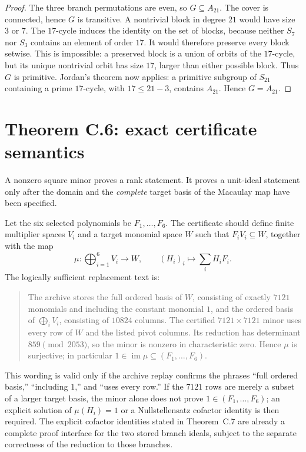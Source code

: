 \documentclass[11pt]{article}
\begin{document}
\begin{proof}
The three branch permutations are even, so $G\subseteq A_{21}$.  The cover
is connected, hence $G$ is transitive.  A nontrivial block in degree $21$
would have size $3$ or $7$.  The $17$-cycle induces the identity on the set
of blocks, because neither $S_7$ nor $S_3$ contains an element of order
$17$.  It would therefore preserve every block setwise.  This is impossible:
a preserved block is a union of orbits of the $17$-cycle, but its unique
nontrivial orbit has size $17$, larger than either possible block.  Thus $G$
is primitive.  Jordan's theorem now applies: a primitive subgroup of
$S_{21}$ containing a prime $17$-cycle, with $17\le21-3$, contains
$A_{21}$.  Hence $G=A_{21}$.
\end{proof}

\section{Theorem C.6: exact certificate semantics}

A nonzero square minor proves a rank statement.  It proves a unit-ideal
statement only after the domain and the \emph{complete} target basis of the
Macaulay map have been specified.

Let the six selected polynomials be $F_1,\dots,F_6$.  The certificate should
define finite multiplier spaces $V_i$ and a target monomial space $W$ such
that $F_iV_i\subseteq W$, together with the map
\[
 \mu:\bigoplus_{i=1}^6V_i\longrightarrow W,
 \qquad (H_i)_i\longmapsto\sum_i H_iF_i.
\]
The logically sufficient replacement text is:

\begin{quote}
The archive stores the full ordered basis of $W$, consisting of exactly
$7121$ monomials and including the constant monomial $1$, and the ordered
basis of $\bigoplus_iV_i$, consisting of $10824$ columns.  The certified
$7121\times7121$ minor uses every row of $W$ and the listed pivot columns.
Its reduction has determinant $859\pmod{2053}$, so the minor is nonzero in
characteristic zero.  Hence $\mu$ is surjective; in particular
$1\in\operatorname{im}\mu\subseteq(F_1,\dots,F_6)$.
\end{quote}

\noindent
This wording is valid only if the archive replay confirms the phrases
``full ordered basis,'' ``including $1$,'' and ``uses every row.''  If the
$7121$ rows are merely a subset of a larger target basis, the minor alone
does not prove $1\in(F_1,\dots,F_6)$; an explicit solution of
$\mu(H_i)=1$ or a Nullstellensatz cofactor identity is then required.
The explicit cofactor identities stated in Theorem~C.7 are already a
complete proof interface for the two stored branch ideals, subject to the
separate correctness of the reduction to those branches.
\end{document}
